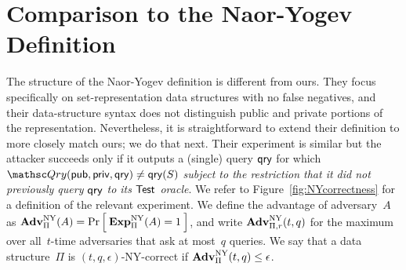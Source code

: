 \section{Comparison to the Naor-Yogev Definition}
\label{sec:compare-defs}
The structure of the Naor-Yogev definition is different from ours.
They focus specifically on set-representation data
structures with no false negatives, and their data-structure syntax
does not distinguish public and private portions of the
representation. Nevertheless, it is straightforward
to extend their definition to more closely match ours; we do that next.
Their experiment is similar but the attacker
succeeds only if it outputs a (single) query $\mathsf{qry}$ for which
$\Qry(\pubaux,\privaux, \qry) \neq \qry(S)$  \emph{subject to the restriction that it did not
previously query $\mathsf{qry}$ to its $\mathsf{Test}$ oracle}. We refer to
Figure~\ref{fig:NYcorrectness} for a definition of the relevant experiment.
We define the advantage of adversary~$A$ as
$\mathrm{\mathbf{Adv}}^{\mathrm{NY}}_{\Pi}(A) = \Pr\left[\: \mathrm{\mathbf{Exp}}^{\mathrm{NY}}_{\Pi}(A)=1 \:\right]$,
and write $\mathrm{\mathbf{Adv}}^{\mathrm{NY}}_{\Pi,r}(t,q)$ for the maximum over
all~$t$-time adversaries that ask at most~$q$ queries. We say that a
data structure~$\Pi$ is $(t,q,\epsilon)$-NY-correct if
$\mathrm{\mathbf{Adv}}^{\mathrm{NY}}_{\Pi}(t,q) \leq \epsilon$. 


